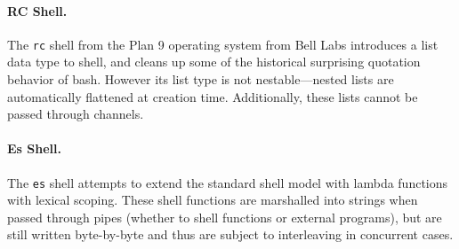 \documentclass[english,preprint,JIP]{ipsj}
\begin{document}
\paragraph{RC Shell.}
The \verb/rc/ shell \cite{duff} from the Plan 9 operating system from Bell Labs introduces a list data type to shell, and cleans up some of the historical surprising quotation behavior of bash. However its list type is not nestable---nested lists are automatically flattened at creation time. Additionally, these lists cannot be passed through channels.

\paragraph{Es Shell.}
The \verb/es/ shell \cite{haahr} attempts to extend the standard shell model with lambda functions with lexical scoping. These shell functions are marshalled into strings when passed through pipes (whether to shell functions or external programs), but are still written byte-by-byte and thus are subject to interleaving in concurrent cases.



\end{document}
